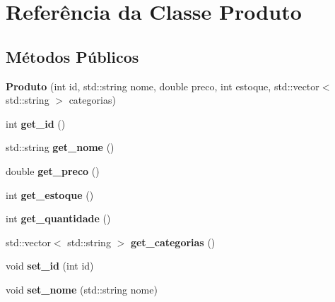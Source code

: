 \hypertarget{class_produto}{}\section{Referência da Classe Produto}
\label{class_produto}
\subsection*{Métodos Públicos}
\begin{DoxyCompactItemize}
\item 
\mbox{\label{class_produto_a2d39bf9da5853de155e921de135a15b6}} 
{\bfseries Produto} (int id, std\+::string nome, double preco, int estoque, std\+::vector$<$ std\+::string $>$ categorias)
\item 
\mbox{\label{class_produto_afa508e556ea143dd1dda5f18977e8e0c}} 
int {\bfseries get\+\_\+id} ()
\item 
\mbox{\label{class_produto_aa28bbbb0d745f285ac75c3112a4be427}} 
std\+::string {\bfseries get\+\_\+nome} ()
\item 
\mbox{\label{class_produto_ac4a188fc1517266ae7f9dbab1fea783d}} 
double {\bfseries get\+\_\+preco} ()
\item 
\mbox{\label{class_produto_a7b237e65ddb678cf24810df56487a24b}} 
int {\bfseries get\+\_\+estoque} ()
\item 
\mbox{\label{class_produto_a7be9c5aa12a4242a13cac4f624a75167}} 
int {\bfseries get\+\_\+quantidade} ()
\item 
\mbox{\label{class_produto_aa13623909f10100d10bccad2a4e5efe8}} 
std\+::vector$<$ std\+::string $>$ {\bfseries get\+\_\+categorias} ()
\item 
\mbox{\label{class_produto_aaa9f6841428285a433fc2f1e391dac65}} 
void {\bfseries set\+\_\+id} (int id)
\item 
\mbox{\label{class_produto_aab21a57fdd549b4b3df4f8a4343436a1}} 
void {\bfseries set\+\_\+nome} (std\+::string nome)
\item 
\mbox{\label{class_produto_a865cb11c47226362c576b14b4987d51a}} 

\end{DoxyCompactItemize}

